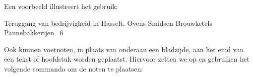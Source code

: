 Een voorbeeld
illustreert het gebruik:

\startbuffer
\startlokalevoetnoten[n=0]
  \plaatstabel
    {Teruggang van bedrijvigheid in Hasselt.}
     \starttabel[|l|c|c|c|c|]
       \HL
       \NC
       \NC Ovens
       \NC Smidsen \NC Brouwketels \NC Pannebakkerijen \NC\SR
       \HL
            \NC\FR
        \NC ~6    \NC\LR
       \HL
       \stoptabel
  \plaatslokalevoetnoten
\stoplokalevoetnoten
\stopbuffer

\typebuffer

\haalbuffer

Ook kunnen voetnoten, in plaats van onderaan een bladzijde,
aan het eind van een tekst of hoofdstuk worden geplaatst.
Hiervoor zetten we  op  en
gebruiken het volgende commando om de noten te plaatsen:


\stoponderdeel
